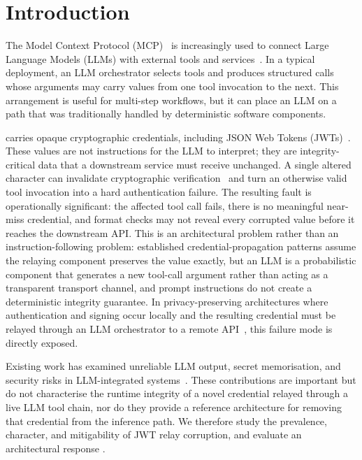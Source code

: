 %

\section{Introduction}\label{sec:introduction}

The Model Context Protocol (MCP)~\cite{anthropic2024mcp} is increasingly used to
connect Large Language Models (LLMs) with external tools and
services~\cite{guo2025measurement,nsa2026mcp}. In a typical deployment, an LLM
orchestrator selects tools and produces structured calls whose arguments may
carry values from one tool invocation to the next. This arrangement is useful
for multi-step workflows, but it can place an LLM on a path that was
traditionally handled by deterministic software components.

 carries opaque cryptographic credentials, including JSON Web
Tokens (JWTs)~\cite{rfc7519,rfc7518}. These values are not instructions for
the LLM to interpret; they are integrity-critical data that a downstream
service must receive unchanged. A single altered character can invalidate
cryptographic verification~\cite{rfc6750} and turn an otherwise valid tool
invocation into a hard authentication failure. The resulting fault is
operationally significant: the affected tool call fails, there is no
meaningful near-miss credential, and format checks may not reveal every
corrupted value before it reaches the downstream API. This is an
architectural problem rather than an instruction-following problem:
established credential-propagation patterns assume the relaying component
preserves the value exactly, but an LLM is a probabilistic component that
generates a new tool-call argument rather than acting as a transparent
transport channel, and prompt instructions do not create a deterministic
integrity guarantee. In privacy-preserving architectures where authentication
and signing occur locally and the resulting credential must be relayed
through an LLM orchestrator to a remote API~\cite{anonymous2026issre}, this
failure mode is directly exposed.

Existing work has examined unreliable LLM output, secret memorisation, and
security risks in LLM-integrated systems~\cite{huang2025hallucination,
ji2023hallucination, nie2025decoding, abadeh2026mcp}. These contributions are
important but do not characterise the runtime integrity of a novel credential
relayed through a live LLM tool chain, nor do they provide a reference
architecture for removing that credential from the inference path. We
therefore study the prevalence, character, and mitigability of JWT relay
corruption, and evaluate an architectural response .

